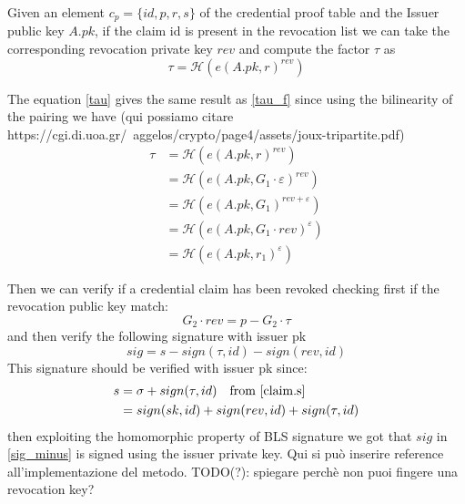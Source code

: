 \documentclass[conference]{IEEEtran}
\begin{document}
Given an element $c_p = \{id, p, r, s \}$ of the credential proof table and the Issuer public key $A.pk$, if the claim id is present in the revocation list we can take the corresponding revocation private key $rev$ and compute the factor $\tau$ as
\begin{equation}\label{tau}
        \tau = \mathcal{H}(e(A.pk, r)^{rev})
\end{equation}

The equation \eqref{tau} gives the same result as \eqref{tau_f} since using the bilinearity of the pairing we have (qui possiamo citare https://cgi.di.uoa.gr/~aggelos/crypto/page4/assets/joux-tripartite.pdf)
\begin{equation*}
    \begin{split}
        \tau &= \mathcal{H}(e(A.pk, r)^{rev}) \\
        &= \mathcal{H}(e(A.pk, G_1 \cdot \varepsilon)^{rev}) \\
        &= \mathcal{H}(e(A.pk, G_1)^{rev + \varepsilon}) \\
        &= \mathcal{H}(e(A.pk, G_1 \cdot rev)^{\varepsilon}) \\
        &= \mathcal{H}(e(A.pk, r_1)^{\varepsilon})
    \end{split}
\end{equation*}

Then we can verify if a credential claim has been revoked checking first if the revocation public key match:
\begin{equation*}
    G_2 \cdot rev = p - G_2 \cdot \tau
\end{equation*}
and then verify the following signature with issuer pk
\begin{equation}\label{sig_minus}
    sig = s - sign(\tau, id) - sign(rev, id) 
\end{equation}
This signature should be verified with issuer pk since:
\begin{equation*}
    \begin{split}
        s &= \sigma + sign(\tau, id) \quad \text{from \eqref{claim.s}} \\
        &=  sign(sk, id) + sign(rev, id) + sign(\tau, id)
    \end{split}
\end{equation*}
then exploiting the homomorphic property of BLS signature
we got that $sig$ in \eqref{sig_minus} is signed using the issuer private key.
Qui si può inserire reference all'implementazione del metodo.
 TODO(?): spiegare perchè non puoi fingere una revocation key?
 
\end{document}
